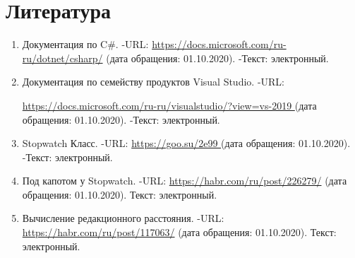 \documentclass[12pt]{report}
\begin{document}
	\newpage
	\chapter*{Литература}
	\begin{enumerate}
		\label{literature}
		\item Документация по C\#. -URL: \href{https://docs.microsoft.com/ru-ru/dotnet/csharp/}{https://docs.microsoft.com/ru-ru/dotnet/csharp/} (дата обращения: 01.10.2020). -Текст: электронный.
		\item Документация по семейству продуктов Visual Studio. -URL:\par \href{https://docs.microsoft.com/ru-ru/visualstudio/?view=vs-2019}{https://docs.microsoft.com/ru-ru/visualstudio/?view=vs-2019 } (дата обращения: 01.10.2020). -Текст: электронный.
		\item Stopwatch Класс. -URL: \href{https://goo.su/2e99}{https://goo.su/2e99 } (дата обращения: 01.10.2020). -Текст: электронный.
		\item Под капотом у Stopwatch. -URL:  \href{https://habr.com/ru/post/226279/}{https://habr.com/ru/post/226279/} (дата обращения: 01.10.2020). Текст: электронный.
		\item Вычисление редакционного расстояния. -URL: \href{https://habr.com/ru/post/117063/}{https://habr.com/ru/post/117063/} (дата обращения: 01.10.2020). Текст: электронный.
	\end{enumerate}
\end{document}
